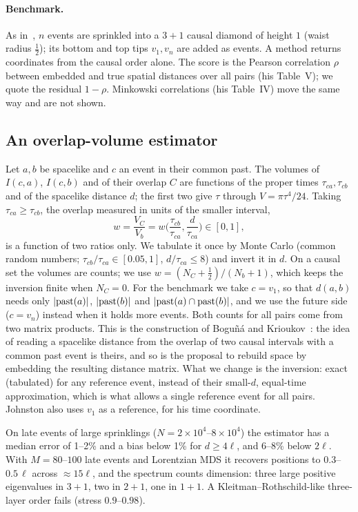 \documentclass[11pt,a4paper]{article}
\begin{document}
\paragraph{Benchmark.} As in~\cite{Johnston25}, $n$ events are sprinkled into a $3+1$ causal diamond of height $1$ (waist radius $\tfrac12$); its bottom and top tips $v_1,v_n$ are added as events. A method returns coordinates from the causal order alone. The score is the Pearson correlation $\rho$ between embedded and true spatial distances over all pairs (his Table~V); we quote the residual $1-\rho$. Minkowski correlations (his Table~IV) move the same way and are not shown.

\subsection{An overlap-volume estimator}
Let $a,b$ be spacelike and $c$ an event in their common past. The volumes of $I(c,a)$, $I(c,b)$ and of their overlap $C$ are functions of the proper times $\tau_{ca},\tau_{cb}$ and of the spacelike distance $d$; the first two give $\tau$ through $V=\pi\tau^4/24$. Taking $\tau_{ca}\ge\tau_{cb}$, the overlap measured in units of the smaller interval,
\begin{equation}
w=\frac{V_C}{V_b}=w\Big(\frac{\tau_{cb}}{\tau_{ca}},\frac{d}{\tau_{ca}}\Big)\in[0,1],
\end{equation}
is a function of two ratios only. We tabulate it once by Monte Carlo (common random numbers; $\tau_{cb}/\tau_{ca}\in[0.05,1]$, $d/\tau_{ca}\le8$) and invert it in $d$. On a causal set the volumes are counts; we use $w=(N_C+\tfrac12)/(N_b+1)$, which keeps the inversion finite when $N_C=0$. For the benchmark we take $c=v_1$, so that $d(a,b)$ needs only $|{\rm past}(a)|$, $|{\rm past}(b)|$ and $|{\rm past}(a)\cap{\rm past}(b)|$, and we use the future side ($c=v_n$) instead when it holds more events. Both counts for all pairs come from two matrix products. This is the construction of Bogu\~n\'a and Krioukov~\cite{BK24}: the idea of reading a spacelike distance from the overlap of two causal intervals with a common past event is theirs, and so is the proposal to rebuild space by embedding the resulting distance matrix. What we change is the inversion: exact (tabulated) for any reference event, instead of their small-$d$, equal-time approximation, which is what allows a single reference event for all pairs. Johnston also uses $v_1$ as a reference, for his time coordinate.

On late events of large sprinklings ($N=2\times10^4$--$8\times10^4$) the estimator has a median error of 1--2\% and a bias below 1\% for $d\ge4\ell$, and 6--8\% below $2\ell$. With $M=80$--$100$ late events and Lorentzian MDS it recovers positions to $0.3$--$0.5\,\ell$ across $\approx15\ell$, and the spectrum counts dimension: three large positive eigenvalues in $3+1$, two in $2+1$, one in $1+1$. A Kleitman--Rothschild-like three-layer order fails (stress $0.9$--$0.98$).
\end{document}
